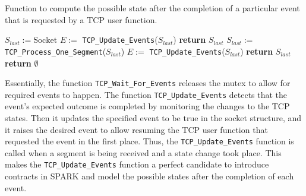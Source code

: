 \documentclass[conference]{IEEEtran}
\def\spark#1{\lstinline[language=Ada]{#1}}
\begin{document}
\begin{algorithm}[t]
    \caption{Function to compute the possible state after the completion of a
particular event that is requested by a TCP user function.}
\label{algo:waitForEvents}
\begin{algorithmic}[1]
\footnotesize
{}
    \State $S_{last} := \text{Socket}$
    \State $E :=$ \spark{TCP_Update_Events}($S_{last}$)
        \State \textbf{return}  $S_{last}$
    \EndIf
        \State $S_{last} :=$ \spark{TCP_Process_One_Segment}($S_{last}$)
        \State $E :=$ \spark{TCP_Update_Events}($S_{last}$)
            \State \textbf{return} $S_{last}$
        \EndIf
    \EndFor
    \State \textbf{return} $\emptyset$
\EndFunction
\end{algorithmic}
\end{algorithm}



Essentially, the function \spark{TCP_Wait_For_Events} releases the mutex to allow for required events to happen. The function \spark{TCP_Update_Events} detects that the event's expected outcome is completed by monitoring the changes to the TCP states. Then it updates the specified event to be true in the socket structure, and it raises the desired event to allow resuming the TCP user function that requested the event in the first place. Thus, the \spark{TCP_Update_Events} function is called when a segment is being received and a state change took place. This makes the \spark{TCP_Update_Events} function a perfect candidate to introduce contracts in SPARK and model the possible states after the completion of each event.
\end{document}
